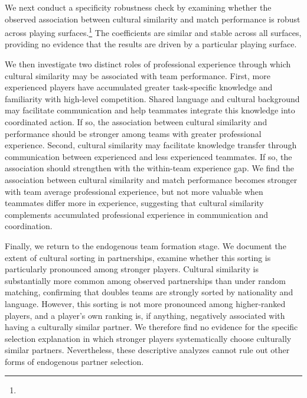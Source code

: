 \documentclass[10pt]{article}
\begin{document}
We next conduct a specificity robustness check by examining whether the observed association between cultural similarity and match performance is robust across playing surfaces.\footnote{} The coefficients are similar and stable across all surfaces, providing no evidence that the results are driven by a particular playing surface. 


We then investigate two distinct roles of professional experience through which cultural similarity may be associated with team performance. %
First, more experienced players have accumulated greater task-specific knowledge and familiarity with high-level competition. Shared language and cultural background may facilitate communication and help teammates integrate this knowledge into coordinated action. If so, the association between cultural similarity and performance should be stronger among teams with greater professional experience. Second, cultural similarity may facilitate knowledge transfer through communication between experienced and less experienced teammates. If so, the association should strengthen with the within-team experience gap. We find the association between cultural similarity and match performance becomes stronger with team average professional experience, but not more valuable when teammates differ more in experience, suggesting that cultural similarity complements accumulated professional experience in communication and coordination.

Finally, we return to the endogenous team formation stage. We document the extent of cultural sorting in partnerships, examine whether this sorting is particularly pronounced among stronger players. Cultural similarity is substantially more common among observed partnerships than under random matching, confirming that doubles teams are strongly sorted by nationality and language. However, this sorting is not more pronounced among higher-ranked players, and a player's own ranking is, if anything, negatively associated with having a culturally similar partner. We therefore find no evidence for the specific selection explanation in which stronger players systematically choose culturally similar partners. Nevertheless, these descriptive analyzes cannot rule out other forms of endogenous partner selection.
\end{document}
